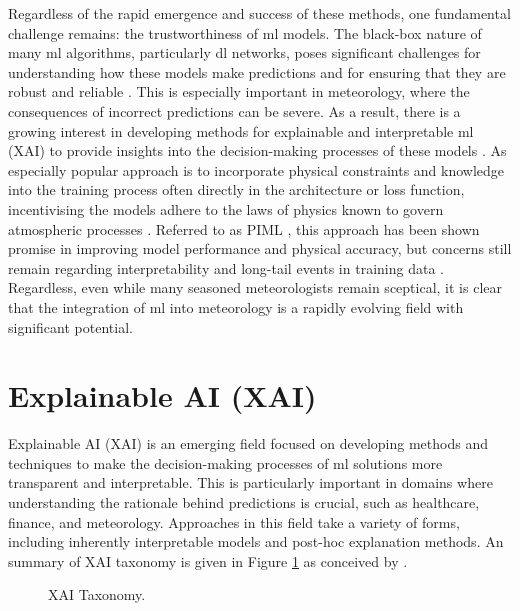 Regardless of the rapid emergence and success of these methods, one fundamental challenge remains: the trustworthiness of \acrshort{ml} models. The black-box nature of many \acrshort{ml} algorithms, particularly \acrshort{dl} networks, poses significant challenges for understanding how these models make predictions and for ensuring that they are robust and reliable . This is especially important in meteorology, where the consequences of incorrect predictions can be severe. As a result, there is a growing interest in developing methods for explainable and interpretable \acrshort{ml} (XAI)  to provide insights into the decision-making processes of these models . As especially popular approach is to incorporate physical constraints and knowledge into the training process often directly in the architecture or loss function, incentivising the models adhere to the laws of physics known to govern atmospheric processes \citep{Dabrowski2020,Chen2022,Luo2025,Zhang2023}. Referred to as PIML , this approach has been shown promise in improving model performance and physical accuracy, but concerns still remain regarding interpretability and long-tail events in training data \citep{Sun2025}. Regardless, even while many seasoned meteorologists remain sceptical, it is clear that the integration of \acrshort{ml} into meteorology is a rapidly evolving field with significant potential.

\section{Explainable AI (XAI)}

Explainable AI (XAI)  is an emerging field focused on developing methods and techniques to make the decision-making processes of \acrshort{ml} solutions more transparent and interpretable. This is particularly important in domains where understanding the rationale behind predictions is crucial, such as healthcare, finance, and meteorology. Approaches in this field take a variety of forms, including inherently interpretable models and post-hoc explanation methods. An summary of XAI taxonomy is given in Figure \ref{fig:xai-taxonomy} as conceived by .

\begin{figure}[h]
    \centering
    \caption{XAI Taxonomy.}
    \label{fig:xai-taxonomy}
\end{figure}

